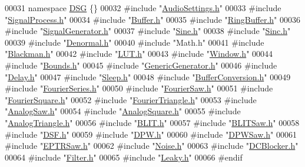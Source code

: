 \begin{DoxyCode}
00031 \textcolor{comment}{}\textcolor{keyword}{namespace }\hyperlink{namespace_d_s_g}{DSG} \{\}
00032 \textcolor{preprocessor}{#include "\hyperlink{_audio_settings_8h}{AudioSettings.h}"}
00033 \textcolor{preprocessor}{#include "\hyperlink{_signal_process_8h}{SignalProcess.h}"}
00034 \textcolor{preprocessor}{#include "\hyperlink{_buffer_8h}{Buffer.h}"}
00035 \textcolor{preprocessor}{#include "\hyperlink{_ring_buffer_8h}{RingBuffer.h}"}
00036 \textcolor{preprocessor}{#include "\hyperlink{_signal_generator_8h}{SignalGenerator.h}"}
00037 \textcolor{preprocessor}{#include "\hyperlink{_sine_8h}{Sine.h}"}
00038 \textcolor{preprocessor}{#include "\hyperlink{_sinc_8h}{Sinc.h}"}
00039 \textcolor{preprocessor}{#include "\hyperlink{_denormal_8h}{Denormal.h}"}
00040 \textcolor{preprocessor}{#include "Math.h"}
00041 \textcolor{preprocessor}{#include "\hyperlink{_blackman_8h}{Blackman.h}"}
00042 \textcolor{preprocessor}{#include "\hyperlink{_l_u_t_8h}{LUT.h}"}
00043 \textcolor{preprocessor}{#include "\hyperlink{_window_8h}{Window.h}"}
00044 \textcolor{preprocessor}{#include "\hyperlink{_bounds_8h}{Bounds.h}"}
00045 \textcolor{preprocessor}{#include "\hyperlink{_generic_generator_8h}{GenericGenerator.h}"}
00046 \textcolor{preprocessor}{#include "\hyperlink{_delay_8h}{Delay.h}"}
00047 \textcolor{preprocessor}{#include "\hyperlink{_sleep_8h}{Sleep.h}"}
00048 \textcolor{preprocessor}{#include "\hyperlink{_buffer_conversion_8h}{BufferConversion.h}"}
00049 \textcolor{preprocessor}{#include "\hyperlink{_fourier_series_8h}{FourierSeries.h}"}
00050 \textcolor{preprocessor}{#include "\hyperlink{_fourier_saw_8h}{FourierSaw.h}"}
00051 \textcolor{preprocessor}{#include "\hyperlink{_fourier_square_8h}{FourierSquare.h}"}
00052 \textcolor{preprocessor}{#include "\hyperlink{_fourier_triangle_8h}{FourierTriangle.h}"}
00053 \textcolor{preprocessor}{#include "\hyperlink{_analog_saw_8h}{AnalogSaw.h}"}
00054 \textcolor{preprocessor}{#include "\hyperlink{_analog_square_8h}{AnalogSquare.h}"}
00055 \textcolor{preprocessor}{#include "\hyperlink{_analog_triangle_8h}{AnalogTriangle.h}"}
00056 \textcolor{preprocessor}{#include "\hyperlink{_b_l_i_t_8h}{BLIT.h}"}
00057 \textcolor{preprocessor}{#include "\hyperlink{_b_l_i_t_saw_8h}{BLITSaw.h}"}
00058 \textcolor{preprocessor}{#include "\hyperlink{_d_s_f_8h}{DSF.h}"}
00059 \textcolor{preprocessor}{#include "\hyperlink{_d_p_w_8h}{DPW.h}"}
00060 \textcolor{preprocessor}{#include "\hyperlink{_d_p_w_saw_8h}{DPWSaw.h}"}
00061 \textcolor{preprocessor}{#include "\hyperlink{_e_p_t_r_saw_8h}{EPTRSaw.h}"}
00062 \textcolor{preprocessor}{#include "\hyperlink{_noise_8h}{Noise.h}"}
00063 \textcolor{preprocessor}{#include "\hyperlink{_d_c_blocker_8h}{DCBlocker.h}"}
00064 \textcolor{preprocessor}{#include "\hyperlink{_filter_8h}{Filter.h}"}
00065 \textcolor{preprocessor}{#include "\hyperlink{_leaky_8h}{Leaky.h}"}
00066 \textcolor{preprocessor}{#endif}
\end{DoxyCode}

